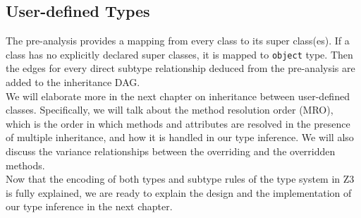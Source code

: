 \subsection{User-defined Types}
The pre-analysis provides a mapping from every class to its super class(es). If a class has no explicitly declared super classes, it is mapped to \lstinline|object| type. Then the edges for every direct subtype relationship deduced from the pre-analysis are added to the inheritance DAG. \\

We will elaborate more in the next chapter on inheritance between user-defined classes. Specifically, we will talk about the method resolution order (MRO), which is the order in which methods and attributes are resolved in the presence of multiple inheritance, and how it is handled in our type inference. We will also discuss the variance relationships between the overriding and the overridden methods.\\

Now that the encoding of both types and subtype rules of the type system in Z3 is fully explained, we are ready to explain the design and the implementation of our type inference in the next chapter.
